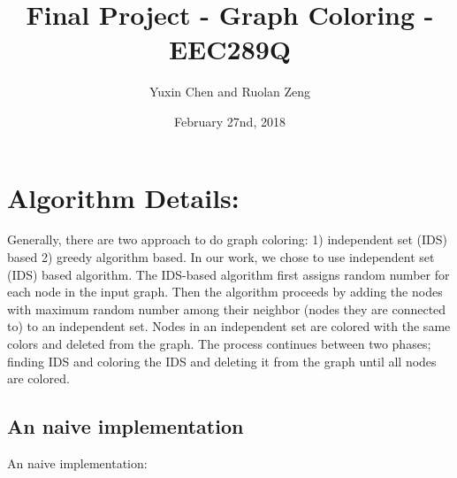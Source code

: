 \documentclass[12pt] {article}
\begin{document}
\title{Final Project - Graph Coloring - EEC289Q}
\author{Yuxin Chen and Ruolan Zeng}
\date{February 27nd, 2018}
\maketitle

\section*{Algorithm Details:}
Generally, there are two approach to do graph coloring: 1) independent set (IDS) based 2) greedy algorithm based. In our work, we chose to use independent set (IDS) based algorithm. 
The IDS-based algorithm first assigns random number for each node in the input graph. Then the algorithm proceeds by adding the nodes with maximum random number among their neighbor (nodes they are connected to) to an independent set. Nodes in an independent set are colored with the same colors and deleted from the graph. The process continues between two phases; finding IDS and coloring the IDS and deleting it from the graph until all nodes are colored. 

\subsection*{An naive implementation}
An naive implementation: 
\end{document}
